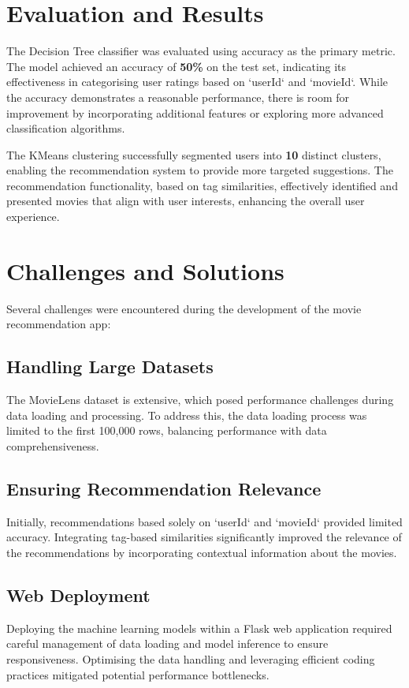 \documentclass[conference]{IEEEtran}
\begin{document}
\section{Evaluation and Results}
The Decision Tree classifier was evaluated using accuracy as the primary metric. The model achieved an accuracy of \textbf{50\%} on the test set, indicating its effectiveness in categorising user ratings based on `userId` and `movieId`. While the accuracy demonstrates a reasonable performance, there is room for improvement by incorporating additional features or exploring more advanced classification algorithms.

The KMeans clustering successfully segmented users into \textbf{10} distinct clusters, enabling the recommendation system to provide more targeted suggestions. The recommendation functionality, based on tag similarities, effectively identified and presented movies that align with user interests, enhancing the overall user experience.

\section{Challenges and Solutions}
Several challenges were encountered during the development of the movie recommendation app:

\subsection{Handling Large Datasets}
The MovieLens dataset is extensive, which posed performance challenges during data loading and processing. To address this, the data loading process was limited to the first 100,000 rows, balancing performance with data comprehensiveness.

\subsection{Ensuring Recommendation Relevance}
Initially, recommendations based solely on `userId` and `movieId` provided limited accuracy. Integrating tag-based similarities significantly improved the relevance of the recommendations by incorporating contextual information about the movies.

\subsection{Web Deployment}
Deploying the machine learning models within a Flask web application required careful management of data loading and model inference to ensure responsiveness. Optimising the data handling and leveraging efficient coding practices mitigated potential performance bottlenecks.
\end{document}
